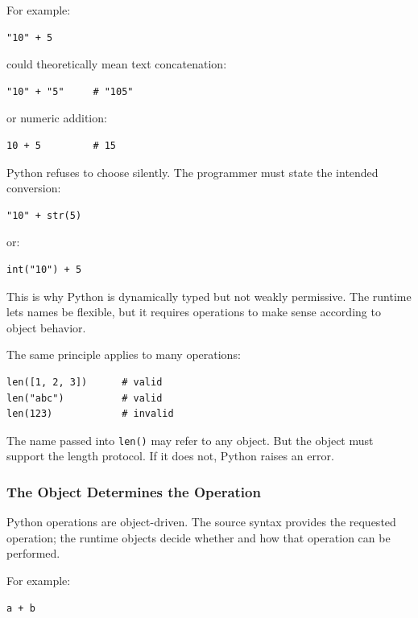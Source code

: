 For example:

\begin{verbatim}
"10" + 5
\end{verbatim}

could theoretically mean text concatenation:

\begin{verbatim}
"10" + "5"     # "105"
\end{verbatim}

or numeric addition:

\begin{verbatim}
10 + 5         # 15
\end{verbatim}

Python refuses to choose silently. The programmer must state the intended conversion:

\begin{verbatim}
"10" + str(5)
\end{verbatim}

or:

\begin{verbatim}
int("10") + 5
\end{verbatim}

This is why Python is dynamically typed but not weakly permissive. The runtime lets names be flexible, but it requires operations to make sense according to object behavior.

The same principle applies to many operations:

\begin{verbatim}
len([1, 2, 3])      # valid
len("abc")          # valid
len(123)            # invalid
\end{verbatim}

The name passed into \texttt{len()} may refer to any object. But the object must support the length protocol. If it does not, Python raises an error.

\subsubsection*{The Object Determines the Operation}

Python operations are object-driven. The source syntax provides the requested operation; the runtime objects decide whether and how that operation can be performed.

For example:

\begin{verbatim}
a + b
\end{verbatim}

